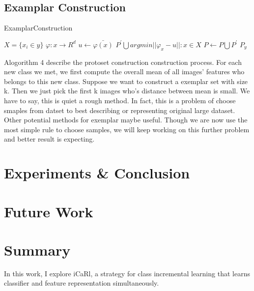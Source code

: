 \documentclass[12pt]{report}
\begin{document}
\section{Examplar Construction}
\begin{algorithm}
	\caption{ExamplarConstruction}
    \begin{algorithmic}[1]
        \REQUIRE $X = \{ x_{i} \in y\}$
        \REQUIRE $\varphi: x \rightarrow R^{d}$
        \STATE $u \leftarrow \bar{\varphi \left( x\right)}$
        \STATE $P^{'} \bigcup argmin ||\varphi_{x} - u||: x \in X$
        \STATE $P \leftarrow P \bigcup P^{'}$
        \ENSURE $P_{y}$
	\end{algorithmic}
\end{algorithm}
\par Alogorithm 4 describe the protoset construction construction process. For each new class we met, we first compute the overall mean of all images' features who belongs to this new class. Suppose we want to construct a exemplar set with size k. Then we just pick the first k images who's distance between mean is small. We have to say, this is quiet a rough method. In fact, this is a problem of choose smaples from datset to best describing or representing original large dataset. Other potential methods for exemplar maybe useful. Though we are now use the most simple rule to choose samples, we will keep working on this further problem and better result is expecting.

\chapter{Experiments \& Conclusion}

\chapter{Future Work}

\chapter{Summary}
\par In this work, I explore iCaRl, a strategy for class incremental learning that learns classifier and feature representation simultaneously. 
\newpage


\end{document}
